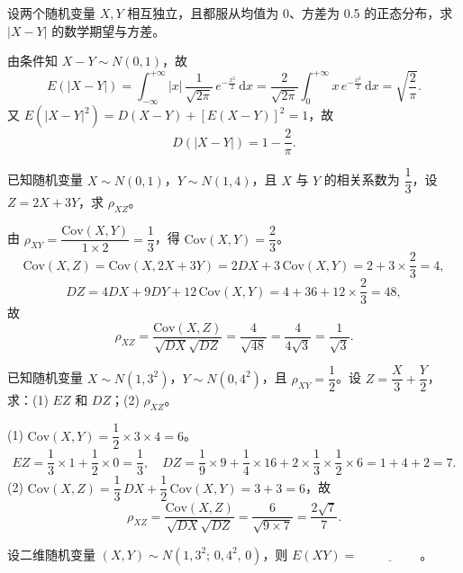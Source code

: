 \documentclass[lang=cn,11pt]{elegantbook}
\begin{document}
\begin{exercise}\label{exer:4-15-absnormal}
设两个随机变量 \(X, Y\) 相互独立，且都服从均值为 0、方差为 0.5 的正态分布，求 \(|X-Y|\) 的数学期望与方差。
\end{exercise}

\begin{solution}
由条件知 \(X-Y \sim N(0,1)\)，故
\[
E(|X-Y|) = \int_{-\infty}^{+\infty}|x|\,\frac{1}{\sqrt{2\pi}}\,e^{-\frac{x^2}{2}}\,\mathrm{d}x = \frac{2}{\sqrt{2\pi}}\int_0^{+\infty}x\,e^{-\frac{x^2}{2}}\,\mathrm{d}x = \sqrt{\frac{2}{\pi}}.
\]
又 \(E(|X-Y|^2) = D(X-Y) + [E(X-Y)]^2 = 1\)，故
\[
D(|X-Y|) = 1 - \frac{2}{\pi}.
\]
\end{solution}

\begin{exercise}\label{exer:4-16-multi}
已知随机变量 \(X \sim N(0,1)\)，\(Y \sim N(1,4)\)，且 \(X\) 与 \(Y\) 的相关系数为 \(\dfrac{1}{3}\)，设 \(Z = 2X + 3Y\)，求 \(\rho_{XZ}\)。
\end{exercise}
\begin{solution}
由 \(\rho_{XY} = \dfrac{\mathrm{Cov}(X,Y)}{1 \times 2} = \dfrac{1}{3}\)，得 \(\mathrm{Cov}(X,Y) = \dfrac{2}{3}\)。
\[
\mathrm{Cov}(X,Z) = \mathrm{Cov}(X, 2X+3Y) = 2DX + 3\,\mathrm{Cov}(X,Y) = 2 + 3 \times \frac{2}{3} = 4,
\]
\[
DZ = 4DX + 9DY + 12\,\mathrm{Cov}(X,Y) = 4 + 36 + 12 \times \frac{2}{3} = 48,
\]
故
\[
\rho_{XZ} = \frac{\mathrm{Cov}(X,Z)}{\sqrt{DX}\sqrt{DZ}} = \frac{4}{\sqrt{48}} = \frac{4}{4\sqrt{3}} = \frac{1}{\sqrt{3}}.
\]
\end{solution}


\begin{exercise}\label{exer:4-rho-xz}
已知随机变量 \(X \sim N(1,3^2)\)，\(Y \sim N(0,4^2)\)，且 \(\rho_{XY} = \dfrac{1}{2}\)。设 \(Z = \dfrac{X}{3} + \dfrac{Y}{2}\)，求：(1) \(EZ\) 和 \(DZ\)；(2) \(\rho_{XZ}\)。
\end{exercise}
\begin{solution}
(1) \(\mathrm{Cov}(X,Y) = \dfrac{1}{2} \times 3 \times 4 = 6\)。
\[
EZ = \frac{1}{3} \times 1 + \frac{1}{2} \times 0 = \frac{1}{3},\quad
DZ = \frac{1}{9} \times 9 + \frac{1}{4} \times 16 + 2 \times \frac{1}{3} \times \frac{1}{2} \times 6 = 1 + 4 + 2 = 7.
\]
(2) \(\mathrm{Cov}(X,Z) = \dfrac{1}{3}\,DX + \dfrac{1}{2}\,\mathrm{Cov}(X,Y) = 3 + 3 = 6\)，故
\[
\rho_{XZ} = \frac{\mathrm{Cov}(X,Z)}{\sqrt{DX}\sqrt{DZ}} = \frac{6}{\sqrt{9 \times 7}} = \frac{2\sqrt{7}}{7}.
\]
\end{solution}



\begin{exercise}\label{exer:4-17-bivariate}
设二维随机变量 \((X,Y) \sim N(1, 3^2;\, 0, 4^2,\, 0)\)，则 \(E(XY) =\,\underline{\hspace{2cm}}\)。
\end{exercise}
\end{document}
